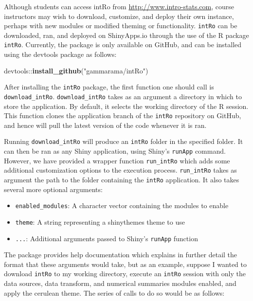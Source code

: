 \documentclass[12pt,]{article}
\providecommand{\tightlist}{%
  \setlength{\itemsep}{0pt}\setlength{\parskip}{0pt}}
\newenvironment{Shaded}{\begin{snugshade}}{\end{snugshade}}
\newcommand{\KeywordTok}[1]{\textcolor[rgb]{0.13,0.29,0.53}{\textbf{{#1}}}}
\newcommand{\StringTok}[1]{\textcolor[rgb]{0.31,0.60,0.02}{{#1}}}
\newcommand{\NormalTok}[1]{{#1}}
\begin{document}
Although students can access intRo from
\url{http://www.intro-stats.com}, course instructors may wish to
download, customize, and deploy their own instance, perhaps with new
modules or modified theming or functionality. \texttt{intRo} can be
downloaded, ran, and deployed on ShinyApps.io through the use of the R
package \texttt{intRo}. Currently, the package is only available on
GitHub, and can be installed using the devtools package as follows:

\begin{Shaded}
\begin{Highlighting}[]
\NormalTok{devtools::}\KeywordTok{install_github}\NormalTok{(}\StringTok{"gammarama/intRo"}\NormalTok{)}
\end{Highlighting}
\end{Shaded}

After installing the \texttt{intRo} package, the first function one
should call is \texttt{download\_intRo}. \texttt{download\_intRo} takes
as an argument a directory in which to store the application. By
default, it selects the working directory of the R session. This
function clones the application branch of the \texttt{intRo} repository
on GitHub, and hence will pull the latest version of the code whenever
it is ran.

Running \texttt{download\_intRo} will produce an \texttt{intRo} folder
in the specified folder. It can then be ran as any Shiny application,
using Shiny's \texttt{runApp} command. However, we have provided a
wrapper function \texttt{run\_intRo} which adds some additional
customization options to the execution process. \texttt{run\_intRo}
takes as argument the path to the folder containing the \texttt{intRo}
application. It also takes several more optional arguments:

\begin{itemize}
\tightlist
\item
  \texttt{enabled\_modules}: A character vector containing the modules
  to enable
\item
  \texttt{theme}: A string representing a shinythemes theme to use
\item
  \texttt{...}: Additional arguments passed to Shiny's \texttt{runApp}
  function
\end{itemize}

The package provides help documentation which explains in further detail
the format that these arguments would take, but as an example, suppose I
wanted to download \texttt{intRo} to my working directory, execute an
\texttt{intRo} session with only the data sources, data transform, and
numerical summaries modules enabled, and apply the cerulean theme. The
series of calls to do so would be as follows:
\end{document}
